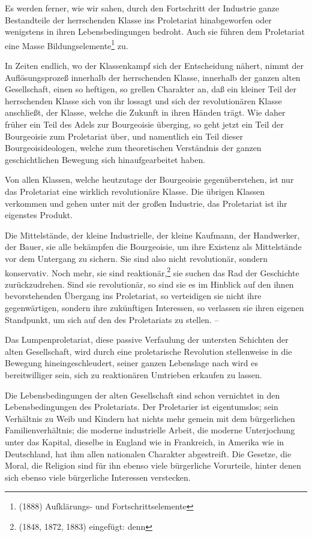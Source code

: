 \documentclass[letterpaper]{article}
\begin{document}
Es werden ferner, wie wir sahen, durch den Fortschritt der Industrie ganze Bestandteile der herrschenden Klasse ins Proletariat hinabgeworfen oder wenigstens in ihren Lebensbedingungen bedroht. Auch sie führen dem Proletariat eine Masse Bildungselemente\footnote{(1888) Aufklärungs- und Fortschrittselemente} zu.

In Zeiten endlich, wo der Klassenkampf sich der Entscheidung nähert, nimmt der Auflösungsprozeß innerhalb der herrschenden Klasse, innerhalb der ganzen alten Gesellschaft, einen so heftigen, so grellen Charakter an, daß ein kleiner Teil der herrschenden Klasse sich von ihr lossagt und sich der revolutionären Klasse anschließt, der Klasse, welche die Zukunft in ihren Händen trägt. Wie daher früher ein Teil des Adels zur Bourgeoisie überging, so geht jetzt ein Teil der Bourgeoisie zum Proletariat über, und namentlich ein Teil dieser Bourgeoisideologen, welche zum theoretischen Verständnis der ganzen geschichtlichen Bewegung sich hinaufgearbeitet haben.

Von allen Klassen, welche heutzutage der Bourgeoisie gegenüberstehen, ist nur das Proletariat eine wirklich revolutionäre Klasse. Die übrigen Klassen verkommen und gehen unter mit der großen Industrie, das Proletariat ist ihr eigenstes Produkt.

Die Mittelstände, der kleine Industrielle, der kleine Kaufmann, der Handwerker, der Bauer, sie alle bekämpfen die Bourgeoisie, um ihre Existenz als Mittelstände vor dem Untergang zu sichern. Sie sind also nicht revolutionär, sondern konservativ. Noch mehr, sie sind reaktionär,\footnote{(1848, 1872, 1883) eingefügt: denn} sie suchen das Rad der Geschichte zurückzudrehen. Sind sie revolutionär, so sind sie es im Hinblick auf den ihnen bevorstehenden Übergang ins Proletariat, so verteidigen sie nicht ihre gegenwärtigen, sondern ihre zukünftigen Interessen, so verlassen sie ihren eigenen Standpunkt, um sich auf den des Proletariats zu stellen. – 

Das Lumpenproletariat, diese passive Verfaulung der untersten Schichten der alten Gesellschaft, wird durch eine proletarische Revolution stellenweise in die Bewegung hineingeschleudert, seiner ganzen Lebenslage nach wird es bereitwilliger sein, sich zu reaktionären Umtrieben erkaufen zu lassen.

Die Lebensbedingungen der alten Gesellschaft sind schon vernichtet in den Lebensbedingungen des Proletariats. Der Proletarier ist eigentumslos; sein Verhältnis zu Weib und Kindern hat nichts mehr gemein mit dem bürgerlichen Familienverhältnis; die moderne industrielle Arbeit, die moderne Unterjochung unter das Kapital, dieselbe in England wie in Frankreich, in Amerika wie in Deutschland, hat ihm allen nationalen Charakter abgestreift. Die Gesetze, die Moral, die Religion sind für ihn ebenso viele bürgerliche Vorurteile, hinter denen sich ebenso viele bürgerliche Interessen verstecken.
\end{document}
